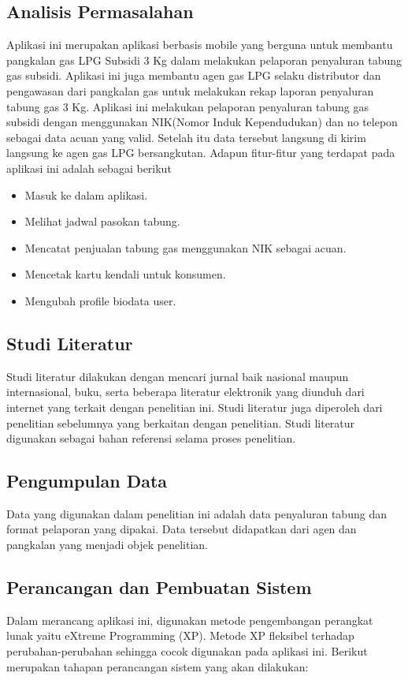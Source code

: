 \subsection{Analisis Permasalahan}
Aplikasi ini merupakan aplikasi berbasis mobile yang berguna untuk membantu pangkalan gas LPG Subsidi 3 Kg dalam melakukan pelaporan penyaluran tabung gas subsidi. Aplikasi ini juga membantu agen gas LPG selaku distributor dan pengawasan dari pangkalan gas untuk melakukan rekap laporan penyaluran tabung gas 3 Kg. Aplikasi ini melakukan pelaporan penyaluran tabung gas subsidi dengan menggunakan NIK(Nomor Induk Kependudukan) dan no telepon sebagai data acuan yang valid. Setelah itu data tersebut langsung di kirim langsung ke agen gas LPG bersangkutan. Adapun fitur-fitur yang terdapat pada aplikasi ini adalah sebagai berikut
\begin{itemize}
		\itemsep0em
		\item Masuk ke dalam aplikasi.
		\item Melihat jadwal pasokan tabung.
		\item Mencatat penjualan tabung gas menggunakan NIK sebagai acuan.
		\item Mencetak kartu kendali untuk konsumen.
		\item Mengubah profile biodata user.
\end{itemize}

\subsection{Studi Literatur}
Studi literatur dilakukan dengan mencari jurnal baik nasional maupun internasional, buku, serta beberapa literatur elektronik yang diunduh dari internet yang terkait dengan penelitian ini. Studi literatur juga diperoleh dari penelitian sebelumnya yang berkaitan dengan penelitian. Studi literatur digunakan sebagai bahan referensi selama proses penelitian.

\subsection{Pengumpulan Data}
Data yang digunakan dalam penelitian ini adalah data penyaluran tabung dan format pelaporan yang dipakai. Data tersebut didapatkan dari agen dan pangkalan yang menjadi objek penelitian.

\subsection{Perancangan dan Pembuatan Sistem}
Dalam merancang aplikasi ini, digunakan metode pengembangan perangkat lunak yaitu eXtreme Programming (XP). Metode XP fleksibel terhadap perubahan-perubahan sehingga cocok digunakan pada aplikasi ini. Berikut merupakan tahapan perancangan sistem yang akan dilakukan:

